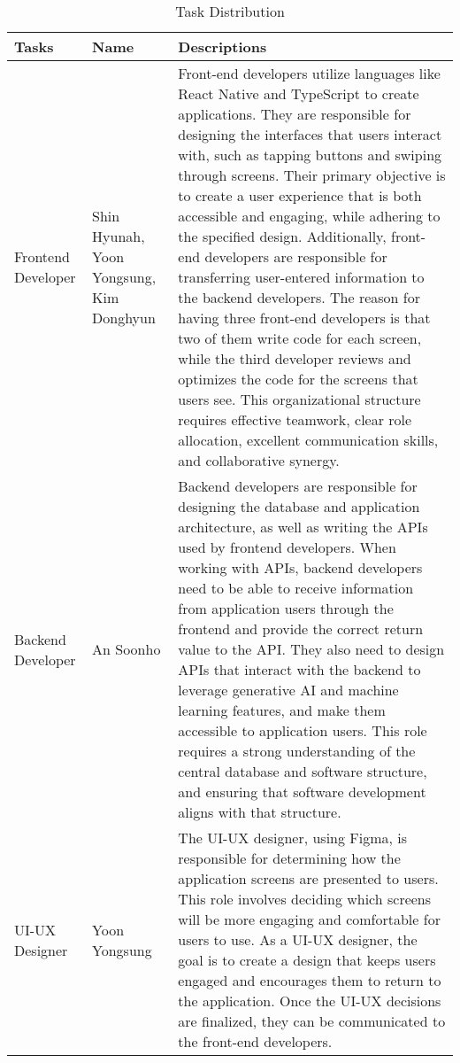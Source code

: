 \documentclass[conference, a4paper]{IEEEtran}
\begin{document}
\begin{table}[h]
\centering
\caption{Task Distribution}
\setlength{\tabcolsep}{12pt}
\renewcommand{\arraystretch}{1.5}
\begin{tabular}{|p{1cm}|p{1.5cm}|p{4cm}|}
\hline Tasks & Name & Descriptions\\ \hline
Frontend Developer & Shin Hyunah, Yoon Yongsung, Kim Donghyun & Front-end developers utilize languages like React Native and TypeScript to create applications. They are responsible for designing the interfaces that users interact with, such as tapping buttons and swiping through screens. Their primary objective is to create a user experience that is both accessible and engaging, while adhering to the specified design. Additionally, front-end developers are responsible for transferring user-entered information to the backend developers. The reason for having three front-end developers is that two of them write code for each screen, while the third developer reviews and optimizes the code for the screens that users see. This organizational structure requires effective teamwork, clear role allocation, excellent communication skills, and collaborative synergy.\\
\hline
Backend Developer & An Soonho & Backend developers are responsible for designing the database and application architecture, as well as writing the APIs used by frontend developers. When working with APIs, backend developers need to be able to receive information from application users through the frontend and provide the correct return value to the API. They also need to design APIs that interact with the backend to leverage generative AI and machine learning features, and make them accessible to application users. This role requires a strong understanding of the central database and software structure, and ensuring that software development aligns with that structure.\\
\hline
UI-UX Designer & Yoon Yongsung & The UI-UX designer, using Figma, is responsible for determining how the application screens are presented to users. This role involves deciding which screens will be more engaging and comfortable for users to use. As a UI-UX designer, the goal is to create a design that keeps users engaged and encourages them to return to the application. Once the UI-UX decisions are finalized, they can be communicated to the front-end developers.\\
\hline
\end{tabular}
\end{table}
\end{document}
